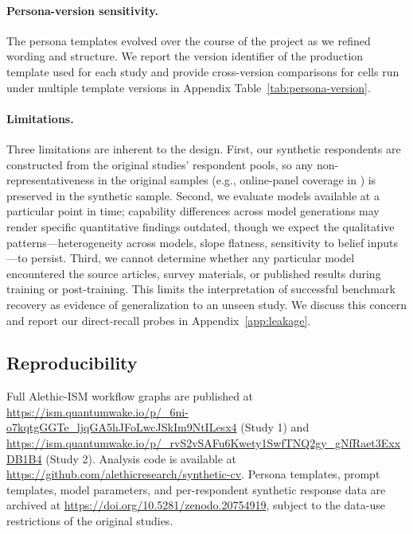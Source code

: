 \documentclass[12pt]{article}
\begin{document}
\paragraph{Persona-version sensitivity.} The persona templates evolved
over the course of the project as we refined wording and structure. We
report the version identifier of the production template used for each
study and provide cross-version comparisons for cells run under multiple
template versions in Appendix Table~\ref{tab:persona-version}.

\paragraph{Limitations.} Three limitations are inherent to the design.
First, our synthetic respondents are constructed from the original
studies' respondent pools, so any non-representativeness in the original
samples (e.g., online-panel coverage in \textcite{Giguere2020}) is
preserved in the synthetic sample. Second, we evaluate models available
at a particular point in time; capability differences across model
generations may render specific quantitative findings outdated, though
we expect the qualitative patterns---heterogeneity across models, slope
flatness, sensitivity to belief inputs---to persist. Third, we cannot determine whether any particular model encountered the
source articles, survey materials, or published results during training
or post-training. This limits the interpretation of successful benchmark
recovery as evidence of generalization to an unseen study. We discuss this concern and report our direct-recall probes in Appendix~\ref{app:leakage}.

\subsection{Reproducibility}\label{sec:methods-reproducibility}

Full Alethic-ISM workflow graphs are published at
\url{https://ism.quantumwake.io/p/_6ni-o7kqtgGGTe_ljqGA5hJFoLwcJSkIm9NtILesx4}
(Study 1) and \url{https://ism.quantumwake.io/p/_rvS2vSAFu6Kwety1SwfTNQ2gy_gNfRaet3ExxDB1B4}
(Study 2). Analysis code is available at \url{https://github.com/alethicresearch/synthetic-cv}. Persona templates,
prompt templates, model parameters, and per-respondent synthetic response data are archived at \url{https://doi.org/10.5281/zenodo.20754919}, subject to the data-use restrictions of the original studies.
%
\end{document}
